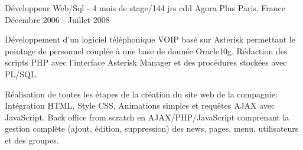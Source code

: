 \cventry
{Développeur Web/Sql - 4 mois de stage/144 jrs cdd} %
{Agora Plus} %
{Paris, France} %
{Décembre 2006 - Juillet 2008} %
{
\begin{cvitems} %
    \item
    {
        Développement d’un logiciel téléphonique VOIP basé sur Asterisk
        permettant le pointage de personnel couplée à une base de donnée Oracle10g.
        Rédaction des scripts PHP avec l'interface Asterisk Manager et des procédures stockées avec PL/SQL.
    }
    \item
    {
        Réalisation de toutes les étapes de la création du site web de la compagnie:
        Intégration HTML, Style CSS, Animations simples et requêtes AJAX avec JavaScript.
        Back office from scratch en AJAX/PHP/JavaScript comprenant la gestion complète (ajout,
        édition, suppression) des news, pages, menu, utilisateurs et des groupes.
    }
\end{cvitems}
}